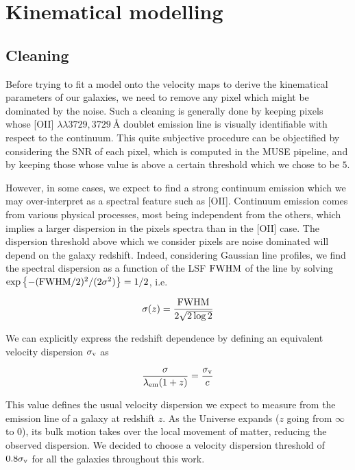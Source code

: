 \clearpage
\section{Kinematical modelling}
\label{sec:kinematical_modelling}

\subsection{Cleaning}

Before trying to fit a model onto the velocity maps to derive the kinematical parameters of our galaxies, we need to remove any pixel which might be dominated by the noise. Such a cleaning is generally done by keeping pixels whose [OII] $\lambda\lambda 3729, \SI{3729}{\angstrom}$ doublet emission line is visually identifiable with respect to the continuum. This quite subjective procedure can be objectified by considering the SNR of each pixel, which is computed in the MUSE pipeline, and by keeping those whose value is above a certain threshold which we chose to be $5$.

However, in some cases, we expect to find a strong continuum emission which we may over-interpret as a spectral feature such as [OII]. Continuum emission comes from various physical processes, most being independent from the others, which implies a larger dispersion in the pixels spectra than in the [OII] case. The dispersion threshold above which we consider pixels are noise dominated will depend on the galaxy redshift. Indeed, considering Gaussian line profiles, we find the spectral dispersion as a function of the LSF $\rm{FWHM}$ of the line by solving $\exp \left \lbrace - ( \rm{FWHM}/2)^2 / (2 \sigma^2 ) \right \rbrace = 1/2$, i.e.

\begin{equation}
	\sigma (z) = \frac{\rm{FWHM}}{2 \sqrt{2 \log 2}}
\end{equation}

We can explicitly express the redshift dependence by defining an equivalent velocity dispersion $\sigma_{\rm{v}}$ as

\begin{equation}
	\frac{\sigma}{\lambda_{\rm{em}} (1+z)} = \frac{\sigma_{\rm{v}}}{c}
\end{equation}

This value defines the usual velocity dispersion we expect to measure from the emission line of a galaxy at redshift $z$. As the Universe expands ($z$ going from $\infty$ to $0$), its bulk motion takes over the local movement of matter, reducing the observed dispersion. We decided to choose a velocity dispersion threshold of $0.8 \sigma_{\rm{v}}$ for all the galaxies throughout this work.

